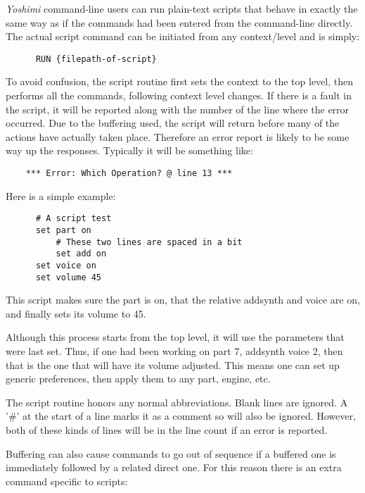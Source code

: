    \textsl{Yoshimi} command-line users can run plain-text scripts that behave
   in exactly the same way as if the commands had been entered from the
   command-line directly.
   The actual script command can be initiated from any context/level
   and is simply:

   \begin{verbatim}
      RUN {filepath-of-script}
   \end{verbatim}

   To avoid confusion, the script routine first sets the context to the
   top level, then performs all the commands, following context level
   changes. If there is a fault in the script, it will be reported along with
   the number of the line where the error occurred. Due to the buffering
   used, the script will return before many of the actions have actually
   taken place. Therefore an error report is likely to be some way up the
   responses. Typically it will be something like:

   \begin{verbatim}
    *** Error: Which Operation? @ line 13 ***
   \end{verbatim}

   Here is a simple example:

   \begin{verbatim}
      # A script test
      set part on
          # These two lines are spaced in a bit
          set add on
      set voice on
      set volume 45
   \end{verbatim}

   This script makes sure the part is on, that the relative addsynth and
   voice are on, and finally sets its volume to 45.

   Although this process starts from the top level, it will use the
   parameters that were last set.
   Thus, if one had been working on part 7, addsynth voice 2,
   then that is the one that will have its volume adjusted.
   This means one can set up generic preferences,
   then apply them to any part, engine, etc.

   The script routine honors any normal abbreviations.
   Blank lines are ignored. A '\#' at the start of a line marks it
   as a comment so will also be ignored. However, both of these kinds
   of lines will be in the line count if an error is reported.

   Buffering can also cause commands to go out of sequence if a buffered one
   is immediately followed by a related direct one. For this reason there is
   an extra command specific to scripts:

